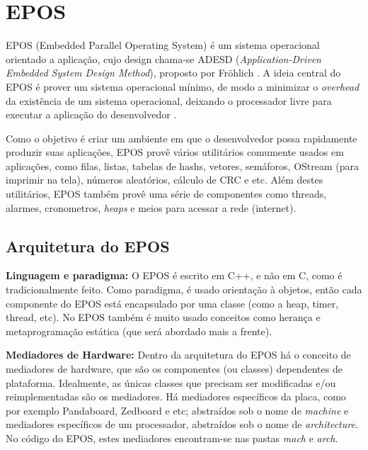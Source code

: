 
\chapter{EPOS}






EPOS (Embedded Parallel Operating System) é um sistema operacional orientado a aplicação, cujo design chama-se ADESD (\emph{Application-Driven Embedded System Design Method}), proposto por Fröhlich \cite{guto_thesis}. A ideia central do EPOS é prover um sistema operacional mínimo, de modo a minimizar o \emph{overhead} da existência de um sistema operacional, deixando o processador livre para executar a aplicação do desenvolvedor \cite{epos_user_guide}.

Como o objetivo é criar um ambiente em que o desenvolvedor possa rapidamente produzir suas aplicações, EPOS provê vários utilitários comumente usados em aplicações, como filas, listas, tabelas de hashs, vetores, semáforos, OStream (para imprimir na tela), números aleatórios, cálculo de CRC e etc. Além destes utilitários, EPOS também provê uma série de componentes como threads, alarmes, cronometros, \emph{heaps} e meios para acessar a rede (internet).

\section{Arquitetura do EPOS}


\textbf{Linguagem e paradigma:} O EPOS é escrito em C++, e não em C, como é tradicionalmente feito. Como paradigma, é usado orientação à objetos, então cada componente do EPOS está encapsulado por uma classe (como a heap, timer, thread, etc). No EPOS também é muito usado conceitos como herança e metaprogramação estática (que será abordado mais a frente).

\textbf{Mediadores de Hardware:} Dentro da arquitetura do EPOS há o conceito de mediadores de hardware, que são os componentes (ou classes) dependentes de plataforma. Idealmente, as únicas classes que precisam ser modificadas e/ou reimplementadas são os mediadores. Há mediadores específicos da placa, como por exemplo Pandaboard, Zedboard e etc; abstraídos sob o nome de \emph{machine} e mediadores específicos de um processador, abstraídos sob o nome de \emph{architecture}. No código do EPOS, estes mediadores encontram-se nas pastas \emph{mach} e \emph{arch}.


